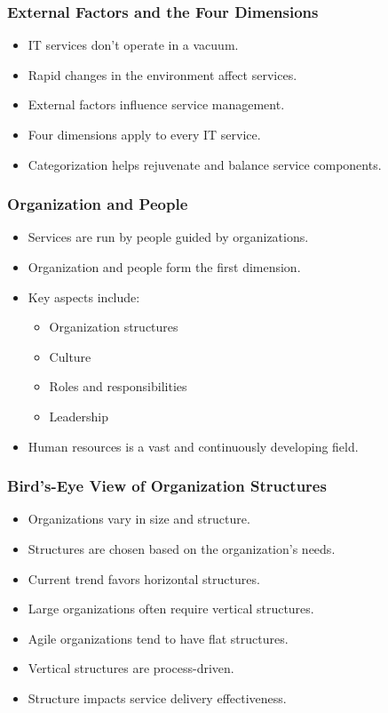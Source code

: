 \documentclass[aspectratio=169, table]{beamer}
\begin{document}
\begin{frame}
	\frametitle{External Factors and the Four Dimensions}
	\begin{itemize}
		\item IT services don't operate in a vacuum.
		\item Rapid changes in the environment affect services.
		\item External factors influence service management.
		\item Four dimensions apply to every IT service.
		\item Categorization helps rejuvenate and balance service components.
	\end{itemize}
\end{frame}

\begin{frame}
	\frametitle{Organization and People}
	\begin{itemize}
		\item Services are run by people guided by organizations.
		\item Organization and people form the first dimension.
		\item Key aspects include:
		\begin{itemize}
			\item Organization structures
			\item Culture
			\item Roles and responsibilities
			\item Leadership
		\end{itemize}
		\item Human resources is a vast and continuously developing field.
	\end{itemize}
\end{frame}

\begin{frame}
	\frametitle{Bird’s-Eye View of Organization Structures}
	\begin{itemize}
		\item Organizations vary in size and structure.
		\item Structures are chosen based on the organization's needs.
		\item Current trend favors horizontal structures.
		\item Large organizations often require vertical structures.
		\item Agile organizations tend to have flat structures.
		\item Vertical structures are process-driven.
		\item Structure impacts service delivery effectiveness.
	\end{itemize}
\end{frame}
\end{document}

